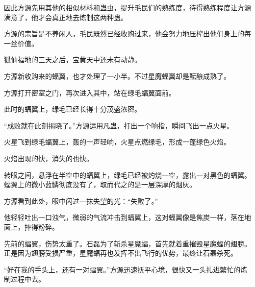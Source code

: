 \begin{this_body}
因此方源先用其他的相似材料和蛊虫，提升毛民们的熟练度，待得熟练程度让方源满意了，他才会真正地去炼制这两种蛊。

方源的宗旨是不养闲人，毛民既然已经收购过来，他会努力地压榨出他们身上的每一丝价值。

狐仙福地的三天之后，宝黄天中还未有动静。

方源新收购来的蝠翼，也才处理了一小半。不过星魔蝠翼却是酝酿成熟了。

方源打开密室之门，再次进入其中，站在绿毛蝠翼面前。

此时的蝠翼上，绿毛已经长得十分茂盛浓密。

“成败就在此刻揭晓了。”方源运用凡蛊，打出一个响指，瞬间飞出一点火星。

火星飞到绿毛蝠翼上，轰的一声轻响，火星点燃绿毛，形成一蓬绿色火焰。

火焰出现的快，消失的也快。

转眼之间，悬浮在半空中的蝠翼上，绿毛已经被灼烧一空，露出一对黑色的蝠翼。蝠翼上的微小蓝鳞彻底没有了，取而代之的是一层深厚的烟灰。

方源看到此处，眼中闪过一抹失望的光：“失败了。”

他轻轻吐出一口浊气，微弱的气流冲击到蝠翼上，这对蝠翼像是焦炭一样，落在地面上，摔得粉碎。

先前的蝠翼，伤势太重了。石磊为了斩杀星魔蝠，首先就着重摧毁星魔蝠的翅膀。正是因为翅膀受损严重，星魔蝠再也发挥不出飞行的优势，最终让石磊杀死。

“好在我的手头上，还有一对蝠翼。”方源迅速抚平心境，很快又一头扎进繁忙的炼制过程中去。

\end{this_body}

